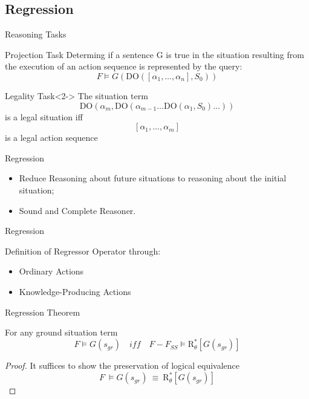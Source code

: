 \subsection{Regression}

\begin{frame}{Reasoning Tasks}
    \vspace*{-0.5cm}
    \begin{block}{Projection Task}
        Determing if a sentence G is true in the situation resulting
        from the execution of an action sequence is represented by the query:
            \[ \textit{F} \models \textit{G}(\text{DO}([\alpha_1, \ldots, \alpha_{n}], S_0)) \]
    \end{block}
    \begin{block}{Legality Task}<2->
        The situation term
            \[ \text{DO}(\alpha_m, \text{DO}(\alpha_{m-1} \ldots \text{DO}(\alpha_1, S_0) \ldots)) \]
        is a legal situation iff 
            \[ [\alpha_1, \ldots, \alpha_{m}] \]
        is a legal action sequence        
    \end{block}    
\end{frame}

\begin{frame}{Regression}
 
    \begin{itemize}
    \item Reduce Reasoning about future situations to reasoning about the initial situation;
    \item Sound and Complete Reasoner.
    \end{itemize}

    \end{frame}

    \begin{frame}{Regression}

    Definition of Regressor Operator through:    

    \begin{itemize}
    \item Ordinary Actions
    \item Knowledge-Producing Actions
    \end{itemize}

\end{frame}       

\begin{frame}{Regression Theorem}
    \begin{theorem}
     For any ground situation term 
     \[ \textit{F} \models \textit{G}(s_{gr}) \quad iff \quad \textit{F} - \textit{F}_{\textit{SS}} \models \text{R}^*_{\theta}[\textit{G}(s_{gr})] \] 
    \end{theorem}
    \begin{proof}
     It suffices to show the preservation of logical equivalence
     \[ \textit{F} \ \models \textit{G}(s_{gr}) \ \equiv \ \text{R}^*_{\theta}[\textit{G}(s_{gr})] \]   
    \end{proof}        
\end{frame}     

